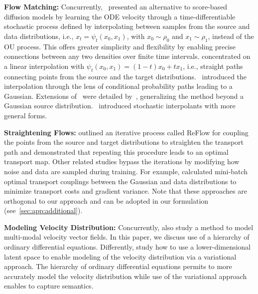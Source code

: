 \textbf{Flow Matching:}
Concurrently,~\citet{liu2023flow,LipmanICLR2023,albergo2023building} presented an alternative to score-based diffusion models by learning the ODE velocity through a time-differentiable stochastic process defined by interpolating between samples from the source and data distributions, i.e., $x_t = \psi_{t} (x_0, x_1)$, 
with $x_0 \sim \rho_0$ and $x_1 \sim \rho_1$, 
instead of the OU process. This offers greater simplicity and flexibility by enabling precise connections between any two densities over finite time intervals. \citet{liu2023flow} concentrated on a linear interpolation with $\psi_{t} (x_0, x_1) = (1-t) x_0 + t x_1$, i.e., straight paths connecting points from the source and the target distributions.~\citet{LipmanICLR2023} introduced the interpolation through the lens of conditional probability paths leading to a Gaussian. Extensions of~\citet{LipmanICLR2023} were detailed by~\citet{tong2023improving}, generalizing the method beyond a Gaussian source distribution.~\citet{albergo2023building,albergo2023stochastic} introduced stochastic interpolants with more general forms. 

\textbf{Straightening Flows:}  
\citet{liu2023flow} outlined an iterative process called ReFlow for coupling the points from the source and target distributions to straighten the transport path and demonstrated that repeating this procedure leads to an optimal transport map. Other related studies bypass the iterations by modifying how noise and data are sampled during training. For example, \citet{pooladian2023multisample,tong2023improving} calculated mini-batch optimal transport couplings between the Gaussian and data distributions to minimize transport costs and gradient variance. %
Note that these approaches are orthogonal to our approach and can be adopted in our formulation (see~\cref{sec:app:additional}). %

\textbf{Modeling Velocity Distribution:} Concurrently, \citet{GuoARXIV2025} also study a method to model multi-modal velocity vector fields. In this paper, we discuss  use of a hierarchy of ordinary differential equations. Differently, \citet{GuoARXIV2025} study how to use a lower-dimensional latent space to enable modeling of the velocity distribution via a variational approach. The hierarchy of ordinary differential equations permits to more accurately model the velocity distribution while use of the variational approach enables to capture semantics.
\vspace{-5pt}

